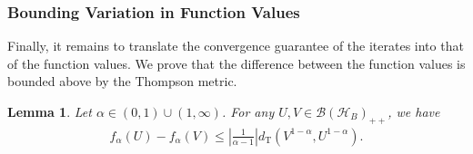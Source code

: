 \documentclass{article}
\newtheorem{lemma}[theorem]{Lemma}
\begin{document}
\subsubsection{Bounding Variation in Function Values}
\label{subsec:ControlFval}
Finally, it remains to translate the convergence guarantee of the iterates into that of the function values.
We prove that the difference between the function values is bounded above by the Thompson metric.
\begin{lemma}
    \label{ineq:SmallThomp2SmallOptError}
    Let $\alpha\in(0,1)\cup(1,\infty)$.
    For any $U,V\in\mathcal{B}\left( \mathcal{H}_B\right)_{++}$, we have
    \begin{align}
        f_{\alpha}\left(U\right)-f_{\alpha}\left(V\right)\leq \left|\frac{1}{\alpha-1}\right|d_{\mathrm{T}}\left(V^{1-\alpha},U^{1-\alpha}\right).
    \end{align}
\end{lemma}
\end{document}
